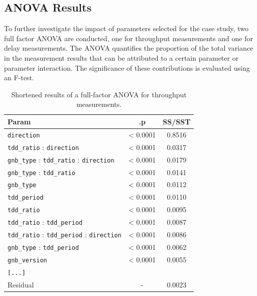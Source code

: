 \subsection{ANOVA Results}\label{sec:eval:anova}

To further investigate the impact of parameters selected for the case study, two full factor \gls{ANOVA} are conducted,
one for throughput measurements and one for delay measurements.
The \gls{ANOVA} quantifies the proportion of the total variance in the measurement results that can be attributed to a certain parameter or parameter interaction.
The significance of these contributions is evaluated using an F-test.


\begin{table}[htb]
\centering
\caption{Shortened results of a full-factor \gls{ANOVA} for throughput measurements.}
\label{tab:eval:anova.iperf.throughput}
\begin{tabular}{l | c | c }

    \toprule
Param                                     & .p        & SS/SST \\
    \midrule
\texttt{direction}                                 & < 0.0001  & 0.8516 \\
\texttt{tdd\_ratio} : \texttt{direction}                       & < 0.0001  & 0.0317 \\
\texttt{gnb\_type} : \texttt{tdd\_ratio} : \texttt{direction}              & < 0.0001  & 0.0179 \\
\texttt{gnb\_type} : \texttt{tdd\_ratio}                        & < 0.0001  & 0.0141 \\
\texttt{gnb\_type}                                  & < 0.0001  & 0.0112 \\
\texttt{tdd\_period}                                & < 0.0001  & 0.0110 \\
\texttt{tdd\_ratio}                                 & < 0.0001  & 0.0095 \\
\texttt{tdd\_ratio} : \texttt{tdd\_period}                      & < 0.0001  & 0.0087 \\
\texttt{tdd\_ratio} : \texttt{tdd\_period} : \texttt{direction}            & < 0.0001  & 0.0086 \\
\texttt{gnb\_type} : \texttt{tdd\_period}                       & < 0.0001  & 0.0062 \\
\texttt{gnb\_version}                               & < 0.0001  & 0.0055 \\
\texttt{[...]} & & \\
Residual                                  &  {-}      & 0.0023 \\

\end{tabular}
\end{table}



